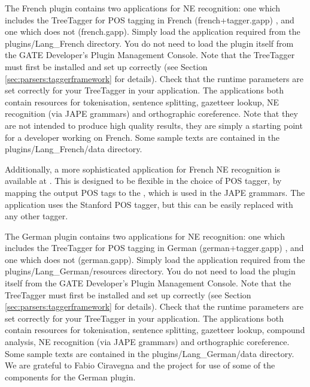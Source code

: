 
The French plugin contains two applications for NE recognition: one
which includes the TreeTagger for POS tagging in French
(french+tagger.gapp) , and one which does not (french.gapp). Simply
load the application required from the plugins/Lang\_French directory. You
do not need to load the plugin itself from the GATE Developer's Plugin
Management Console. Note that the TreeTagger must first be installed and set up
correctly (see Section \ref{sec:parsers:taggerframework} for
details). Check that the runtime parameters are set correctly for your
TreeTagger in your application. The applications both contain
resources for tokenisation, sentence splitting, gazetteer lookup, NE
recognition (via JAPE grammars) and orthographic coreference. Note
that they are not intended to produce high quality results, they are
simply a starting point for a developer working on French. Some sample
texts are contained in the plugins/Lang\_French/data directory.

Additionally, a more sophisticated application for French NE recognition is
available at .
This is designed to be flexible in the choice of POS tagger, by mapping the output POS 
tags to the , 
which is used in the JAPE grammars. The application uses the Stanford POS tagger, 
but this can be easily replaced with any other tagger.


The German plugin contains two applications for NE recognition: one
which includes the TreeTagger for POS tagging in German
(german+tagger.gapp) , and one which does not (german.gapp). Simply
load the application required from the plugins/Lang\_German/resources
directory. You do not need to load the plugin itself from the GATE
Developer's Plugin Management Console. Note that the TreeTagger must first be
installed and set up correctly (see
Section \ref{sec:parsers:taggerframework} for details). Check that the
runtime parameters are set correctly for your TreeTagger in your
application. The applications both contain resources for tokenisation,
sentence splitting, gazetteer lookup, compound analysis, NE
recognition (via JAPE grammars) and orthographic coreference. Some
sample texts are contained in the plugins/Lang\_German/data directory. We
are grateful to Fabio Ciravegna and
the  project for use
of some of the components for the German plugin. 

